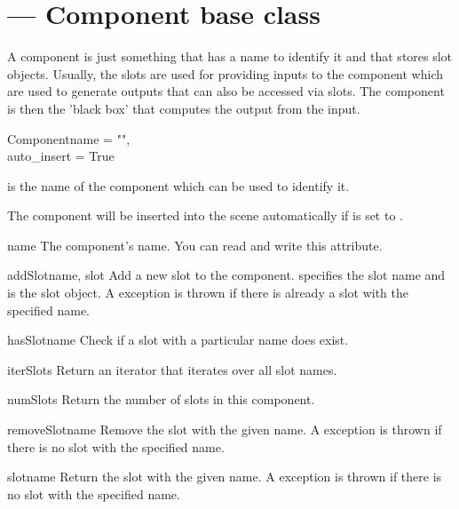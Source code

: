 
\section{ ---
         Component base class}

A component is just something that has a name to identify it and that
stores slot objects. Usually, the slots are used for providing inputs
to the component which are used to generate outputs that can also be
accessed via slots. The component is then the 'black box' that computes
the output from the input.

\begin{classdesc}{Component}{name = "", \\
		             auto_insert = True}

 is the name of the component which can be used to identify it.

The component will be inserted into the scene automatically if 
 is set to .
\end{classdesc}

\begin{memberdesc}{name}
The component's name. You can read and write this attribute.
\end{memberdesc}


\begin{methoddesc}{addSlot}{name, slot}
Add a new slot to the component.  specifies the slot name and
 is the slot object. A  exception is
thrown if there is already a slot with the specified name.
\end{methoddesc}

\begin{methoddesc}{hasSlot}{name}
Check if a slot with a particular name does exist.
\end{methoddesc}

\begin{methoddesc}{iterSlots}{}
Return an iterator that iterates over all slot names.
\end{methoddesc}

\begin{methoddesc}{numSlots}{}
Return the number of slots in this component.
\end{methoddesc}

\begin{methoddesc}{removeSlot}{name}
Remove the slot with the given name. A  exception
is thrown if there is no slot with the specified name.
\end{methoddesc}

\begin{methoddesc}{slot}{name}
Return the slot with the given name. A  exception
is thrown if there is no slot with the specified name.
\end{methoddesc}







